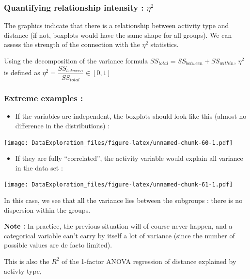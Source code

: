 \documentclass[
]{book}
\providecommand{\tightlist}{%
  \setlength{\itemsep}{0pt}\setlength{\parskip}{0pt}}
\begin{document}
\hypertarget{quantifying-relationship-intensity-eta2}{%
\subsubsection{\texorpdfstring{Quantifying relationship intensity : \(\eta^2\)}{Quantifying relationship intensity : \textbackslash eta\^{}2}}\label{quantifying-relationship-intensity-eta2}}

The graphics indicate that there is a relationship between activity type and distance (if not, boxplots would have the same shape for all groups). We can assess the strength of the connection with the \(\eta^2\) statistics.

Using the decomposition of the variance formula \(SS_{total} = SS_{between} + SS_{within}\), \(\eta^2\) is defined as \(\eta^2 = \dfrac{SS_{between}}{SS_{total}} \in [0,1]\)

\hypertarget{extreme-examples-1}{%
\subsubsection{Extreme examples :}\label{extreme-examples-1}}

\begin{itemize}
\tightlist
\item
  If the variables are independent, the boxplots should look like this (almost no difference in the distributions) :
\end{itemize}

\texttt{[image: DataExploration\_files/figure-latex/unnamed-chunk-60-1.pdf]}

\begin{itemize}
\tightlist
\item
  If they are fully ``correlated'', the activity variable would explain all variance in the data set :
\end{itemize}

\texttt{[image: DataExploration\_files/figure-latex/unnamed-chunk-61-1.pdf]}

In this case, we see that all the variance lies between the subgroups : there is no dispersion within the groups.

\textbf{Note :} In practice, the previous situation will of course never happen, and a categorical variable can't carry by itself a lot of variance (since the number of possible values are de facto limited).

This is also the \(R^2\) of the 1-factor ANOVA regression of distance explained by activty type,
\end{document}
